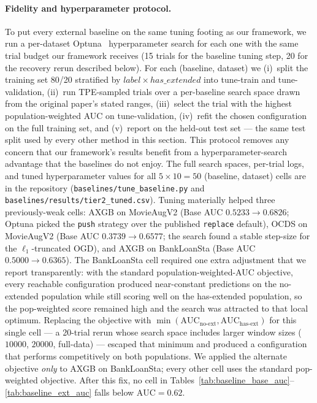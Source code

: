 \documentclass[sigconf]{acmart}
\begin{document}
\begin{itemize}
\paragraph{Fidelity and hyperparameter protocol.} To put every external baseline on the same tuning footing as our framework, we run a per-dataset Optuna~\cite{optuna} hyperparameter search for each one with the same trial budget our framework receives (15 trials for the baseline tuning step, 20 for the recovery rerun described below). For each (baseline, dataset) we (i)~split the training set 80/20 stratified by $label\times has\_extended$ into tune-train and tune-validation, (ii)~run TPE-sampled trials over a per-baseline search space drawn from the original paper's stated ranges, (iii)~select the trial with the highest population-weighted AUC on tune-validation, (iv)~refit the chosen configuration on the full training set, and (v)~report on the held-out test set --- the same test split used by every other method in this section. This protocol removes any concern that our framework's results benefit from a hyperparameter-search advantage that the baselines do not enjoy. The full search spaces, per-trial logs, and tuned hyperparameter values for all $5\!\times\!10\!=\!50$ (baseline, dataset) cells are in the repository (\texttt{baselines/tune\_baseline.py} and \texttt{baselines/results/tier2\_tuned.csv}). Tuning materially helped three previously-weak cells: AXGB on MovieAugV2 (Base AUC $0.5233\!\to\!0.6826$; Optuna picked the \texttt{push} strategy over the published \texttt{replace} default), OCDS on MovieAugV2 (Base AUC $0.3739\!\to\!0.6577$; the search found a stable step-size for the $\ell_1$-truncated OGD), and AXGB on BankLoanSta (Base AUC $0.5000\!\to\!0.6365$). The BankLoanSta cell required one extra adjustment that we report transparently: with the standard population-weighted-AUC objective, every reachable configuration produced near-constant predictions on the no-extended population while still scoring well on the has-extended population, so the pop-weighted score remained high and the search was attracted to that local optimum. Replacing the objective with $\min(\text{AUC}_\text{no-ext}, \text{AUC}_\text{has-ext})$ for this single cell --- a 20-trial rerun whose search space includes larger window sizes ($10000$, $20000$, full-data) --- escaped that minimum and produced a configuration that performs competitively on both populations. We applied the alternate objective \emph{only} to AXGB on BankLoanSta; every other cell uses the standard pop-weighted objective. After this fix, no cell in Tables~\ref{tab:baseline_base_auc}--\ref{tab:baseline_ext_auc} falls below $\text{AUC}=0.62$.


\end{itemize}
\end{document}
